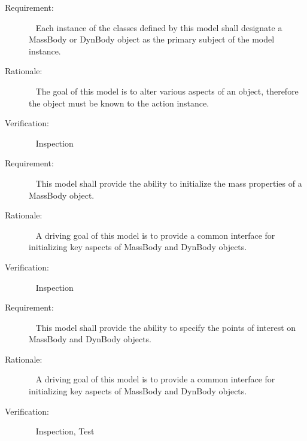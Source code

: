 \label{reqt:overview:subject_body}
\begin{description}
\item[Requirement:]\ \newline
  Each instance of the classes defined by this model
  shall designate a MassBody or DynBody object as the primary subject
  of the model instance.

\item[Rationale:]\ \newline
  The goal of this model is to alter various aspects of an object, therefore
  the object must be known to the action instance.

\item[Verification:]\ \newline
  Inspection
\end{description}

\label{reqt:overview:mass_ppty_init}
\begin{description}
\item[Requirement:]\ \newline
  This model shall provide the ability to
  initialize the mass properties of a MassBody object.

\item[Rationale:]\ \newline
  A driving goal of this model is to provide a common interface
  for initializing key aspects of MassBody and DynBody objects.

\item[Verification:]\ \newline
  Inspection
\end{description}

\label{reqt:overview:mass_point_init}
\begin{description}
\item[Requirement:]\ \newline
  This model shall provide the ability to specify the
  points of interest on MassBody and DynBody objects.

\item[Rationale:]\ \newline
  A driving goal of this model is to provide a common interface
  for initializing key aspects of MassBody and DynBody objects.

\item[Verification:]\ \newline
  Inspection, Test
\end{description}

